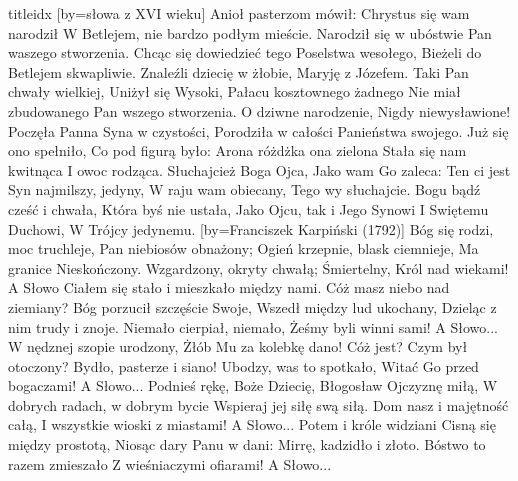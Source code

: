 \documentclass[a5paper, portrait, 12pt]{mwart}
\begin{document}
\begin{songs}{titleidx}
[by={słowa z XVI wieku}]
\beginverse
    Anioł pasterzom mówił:
    Chrystus się wam narodził
    W Betlejem, nie bardzo podłym mieście.
    Narodził się w ubóstwie
    Pan waszego stworzenia.
\endverse
\beginverse
    Chcąc się dowiedzieć tego
    Poselstwa wesołego,
    Bieżeli do Betlejem skwapliwie.
    Znaleźli dziecię w żłobie,
    Maryję z Józefem.
\endverse
\beginverse
    Taki Pan chwały wielkiej,
    Uniżył się Wysoki,
    Pałacu kosztownego żadnego
    Nie miał zbudowanego
    Pan wszego stworzenia.
\endverse
\beginverse
    O dziwne narodzenie,
    Nigdy niewysławione!
    Poczęła Panna Syna w czystości,
    Porodziła w całości
    Panieństwa swojego.
\endverse
\beginverse
    Już się ono spełniło,
    Co pod figurą było:
    Arona różdżka ona zielona
    Stała się nam kwitnąca
    I owoc rodząca.
\endverse
\beginverse
    Słuchajcież Boga Ojca,
    Jako wam Go zaleca:
    Ten ci jest Syn najmilszy, jedyny,
    W raju wam obiecany,
    Tego wy słuchajcie.
\endverse
\beginverse
    Bogu bądź cześć i chwała,
    Która byś nie ustała,
    Jako Ojcu, tak i Jego Synowi
    I Swiętemu Duchowi,
    W Trójcy jedynemu.
\endverse
\endsong
[by={Franciszek Karpiński (1792)}]
\beginverse
    Bóg się rodzi, moc truchleje,
    Pan niebiosów obnażony;
    Ogień krzepnie, blask ciemnieje,
    Ma granice Nieskończony.
    Wzgardzony, okryty chwałą;
    Śmiertelny, Król nad wiekami!
\endverse
\beginchorus
	A Słowo Ciałem się stało
	i mieszkało między nami.
\endchorus
\beginverse
    Cóż masz niebo nad ziemiany?
    Bóg porzucił szczęście Swoje,
    Wszedł między lud ukochany,
    Dzieląc z nim trudy i znoje.
    Niemało cierpiał, niemało,
    Żeśmy byli winni sami!
\endverse
\beginchorus
	A Słowo...
\endchorus
\beginverse
    W nędznej szopie urodzony,
    Żłób Mu za kolebkę dano!
    Cóż jest? Czym był otoczony?
    Bydło, pasterze i siano!
    Ubodzy, was to spotkało,
    Witać Go przed bogaczami!
\endverse
\beginchorus
	A Słowo...
\endchorus
\beginverse
    Podnieś rękę, Boże Dziecię,
    Błogosław Ojczyznę miłą,
    W dobrych radach, w dobrym bycie
    Wspieraj jej siłę swą siłą.
    Dom nasz i majętność całą,
    I wszystkie wioski z miastami!
\endverse
\beginchorus
	A Słowo...
\endchorus
\beginverse
    Potem i króle widziani
    Cisną się między prostotą,
    Niosąc dary Panu w dani:
    Mirrę, kadzidło i złoto.
    Bóstwo to razem zmieszało
    Z wieśniaczymi ofiarami!
\endverse
\beginchorus
	A Słowo...
\endchorus
\endsong


\end{songs}
\end{document}
